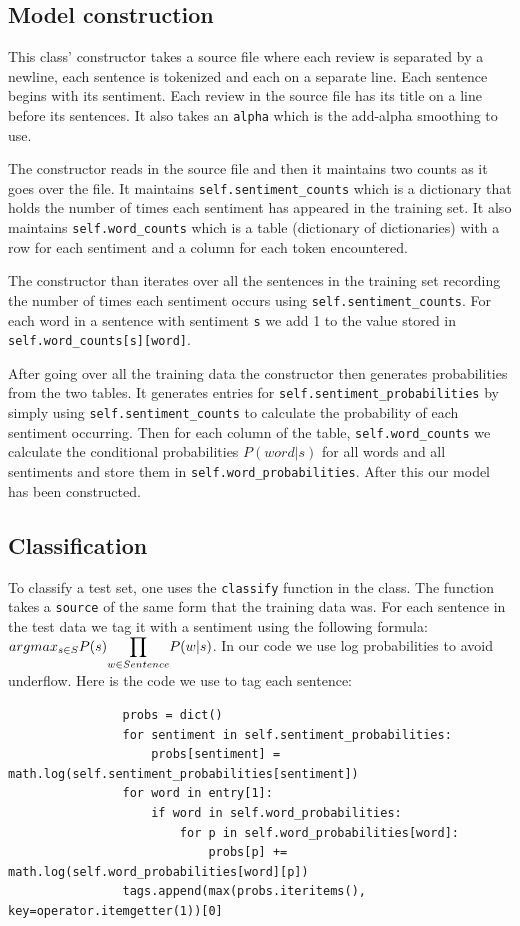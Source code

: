 \documentclass{article}
\begin{document}
\subsection{Model construction}
This class' constructor takes a source file where each review is separated by a newline, each sentence is tokenized and each on a separate line. Each sentence begins with its sentiment. Each review in the source file has its title on a line before its sentences. It also takes an \texttt{alpha} which is the add-alpha smoothing to use.

The constructor reads in the source file and then it maintains two counts as it goes over the file. It maintains \texttt{self.sentiment\_counts} which is a dictionary that holds the number of times each sentiment has appeared in the training set. It also maintains \texttt{self.word\_counts} which is a table (dictionary of dictionaries) with a row for each sentiment and a column for each token encountered. 

The constructor than iterates over all the sentences in the training set recording the number of times each sentiment occurs using \texttt{self.sentiment\_counts}. For each word in a sentence with sentiment \texttt{s} we add 1 to the value stored in \texttt{self.word\_counts[s][word]}. 

After going over all the training data the constructor then generates probabilities from the two tables. It generates entries for \texttt{self.sentiment\_probabilities} by simply using \texttt{self.sentiment\_counts} to calculate the probability of each sentiment occurring. Then for each column of the table, \texttt{self.word\_counts} we calculate the conditional probabilities $P(word|s)$ for all words and all sentiments and store them in \texttt{self.word\_probabilities}. After this our model has been constructed.


\subsection{Classification}
To classify a test set, one uses the \texttt{classify} function in the class. The function takes a \texttt{source} of the same form that the training data was. For each sentence in the test data we tag it with a sentiment using the following formula: $argmax_{s\in S}P(s)\mathlarger{\prod}_{w\in Sentence} P(w|s)$. In our code we use log probabilities to avoid underflow. Here is the code we use to tag each sentence:

\begin{verbatim}
                probs = dict()
                for sentiment in self.sentiment_probabilities:
                    probs[sentiment] = math.log(self.sentiment_probabilities[sentiment])
                for word in entry[1]:
                    if word in self.word_probabilities:
                        for p in self.word_probabilities[word]:
                            probs[p] += math.log(self.word_probabilities[word][p])
                tags.append(max(probs.iteritems(), key=operator.itemgetter(1))[0]
\end{verbatim}
\end{document}

